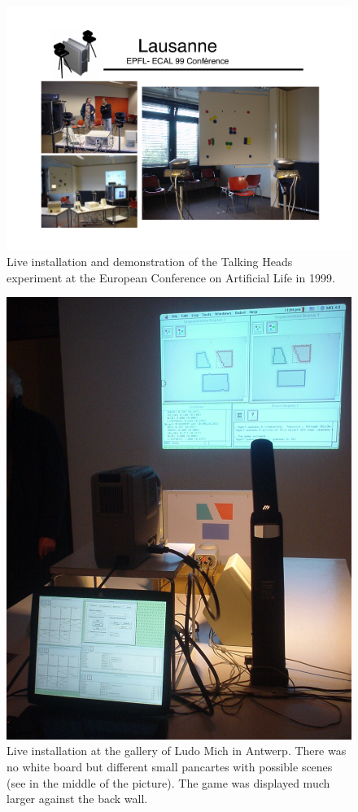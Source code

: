 \begin{figure}[htbp]
  \centerline{\includegraphics[width=.90\textwidth]{chap9/figs/Lausanne.pdf}}
\caption{\label{fig:lausanne}Live installation and demonstration of the Talking Heads experiment at the European Conference on Artificial 
Life in 1999.}
\end{figure}
\begin{figure}[htbp]
  \centerline{\includegraphics[width=.80\textwidth]{chap9/figs/mich-gallery.pdf}}
\caption{\label{fig:mich}Live installation at the gallery of Ludo Mich in Antwerp. There was no white board but different 
small pancartes with possible scenes (see in the middle of the picture). The game was displayed much larger against
the back wall.}
\end{figure}

